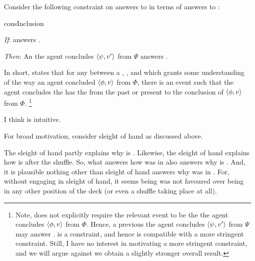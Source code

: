 \begin{note}
  Consider the following constraint on answers to \qWhy{} in terms of answers to \qHow{}:

  \begin{constraint}{consInclusion}{\issueInclusion{}}
    \mbox{}
    \vspace{-\baselineskip}
    \begin{itenum}
    \item[\emph{If}:]
       answers \qWhy{}.
    \item[\emph{Then}:]
      An  the agent concludes \(\langle\psi, v'\rangle\) from \(\Psi\) answers \qHow{}.
    \end{itenum}
    \vspace{-\baselineskip}
  \end{constraint}

  \noindent%
  In short, \issueInclusion{} states that for any \fingfr{} between a , , and \pool{} which grants some understanding of the way an agent concluded \(\langle\phi, v\rangle\) from \(\Phi\), there is an event such that the agent concludes the \prop{} has the \val{} from the \pool{} past or present to the \agents{} conclusion of \(\langle\phi, v\rangle\) from \(\Phi\).%
  \footnote{
    Note, \qHow{} does not explicitly require the relevant event to be the  the agent concludes \(\langle\phi, v\rangle\) from \(\Phi\).
    Hence, a previous  the agent concludes \(\langle\psi, v'\rangle\) from \(\Psi\) may answer \qHow{}.
    \issueInclusion{} is a constraint, and hence is compatible with a more stringent constraint.
    Still, I have no interest in motivating a more stringent constraint, and we will argue against \issueInclusion{} we obtain a slightly stronger overall result.
  }
\end{note}


\begin{note}
  I think \issueInclusion{} is intuitive.
\end{note}


\begin{note}
  For broad motivation, consider sleight of hand as discussed above.

  The sleight of hand partly explains why \mainCard{} is \mainCardPos{}.
  Likewise, the sleight of hand explains how \mainCard{} is \mainCardPos{} after the shuffle.
  So, what answers how \mainCard{} was in \mainCardPos{} also answers why \mainCard{} is \mainCardPos{}.
  And, it is plausible nothing other than sleight of hand answers why \mainCard{} was in \mainCardPos{}.
  For, without engaging in sleight of hand, it seems \mainCard{} being \mainCardPos{} was not favoured over \mainCard{} being in any other position of the deck (or even a shuffle taking place at all).
\end{note}



